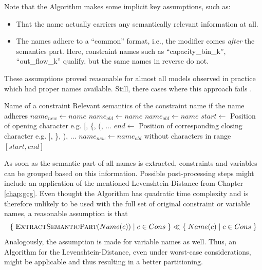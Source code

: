 			Note that the Algorithm makes some implicit key assumptions, such as:
			\begin{itemize}
				\item That the name actually carriers any semantically relevant information at all.
				\item The names adhere to a \enquote{common} format, i.e., the modifier comes \textit{after} the semantics part. Here, constraint names such as \enquote{capacity\_bin\_k}, \enquote{out\_flow\_k} qualify, but the same names in reverse do not.
			\end{itemize}
			
			These assumptions proved reasonable for almost all models observed in practice which had proper names available. Still, there cases where this approach fails .
		
			\begin{algorithm}[ht!]
				\centering
				\begin{algorithmic}
					\Require Name of a constraint
					\Ensure Relevant semantics of the constraint name if the name adheres 
					\Statex
						\State ${name}_{new} \gets name$
						\State ${name}_{old} \gets name$
						\Repeat
							\State ${name}_{old} \gets name$
							\State $start \gets$ Position of opening character e.g. $\lbrack$, \{, (, $\ldots$
							\State $end \gets$ Position of corresponding closing character e.g. $\rbrack$, \}, ), $\ldots$
							\State ${name}_{new} \gets {name}_{old}$ without characters in range $[start, end]$ 
					\EndFunction
				\end{algorithmic}
				\caption{}
				\label{algo:tree:scoring:nameheur}
			\end{algorithm}
			
			As soon as the semantic part of all names is extracted, constraints and variables can be grouped based on this information.
			Possible post-processing steps might include an application of the mentioned Levenshtein-Distance from Chapter \ref{chap:gcg}.
			Even thought the Algorithm has quadratic time complexity and is therefore unlikely to be used with the full set of original constraint or variable names, a reasonable assumption is that
			\begin{equation*}
				\{ \; \Call{ExtractSemanticPart}{Name(c)} \mid c \in Cons \; \} \ll \{ \; Name(c) \mid c \in Cons \; \}
			\end{equation*}
			Analogously, the assumption is made for variable names as well.
			Thus, an Algorithm for the Levenshtein-Distance, even under worst-case considerations, might be applicable and thus resulting in a better partitioning.
			
